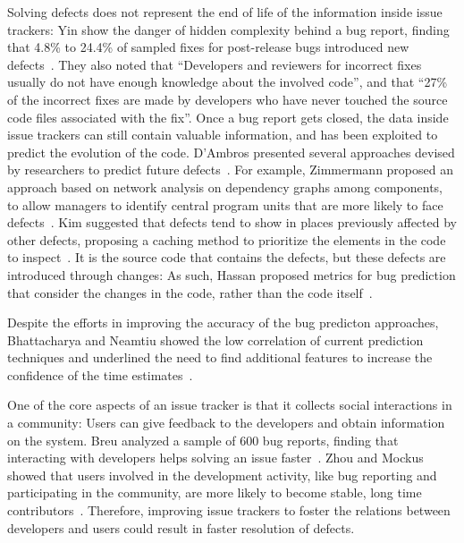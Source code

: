 Solving defects does not represent the end of life of the information inside issue trackers: Yin \etal show the danger of hidden complexity behind a bug report, finding that 4.8\% to 24.4\% of sampled fixes for post-release bugs introduced new defects~\cite{Yin2011a}. They also noted that ``Developers and reviewers for incorrect fixes usually do not have enough knowledge about the involved code'', and that ``27\% of the incorrect fixes are made by developers who have never touched the source code files associated with the fix''. Once a bug report gets closed, the data inside issue trackers can still contain valuable information, and has been exploited to predict the evolution of the code. D'Ambros \etal presented several approaches devised by researchers to predict future defects~\cite{DAmb2012a}. For example,  Zimmermann \etal proposed an approach based on network analysis on dependency graphs among components, to allow managers to identify central program units that are more likely to face defects~\cite{Zimm2008a}. Kim \etal suggested that defects tend to show in places previously affected by other defects, proposing a caching method to prioritize the elements in the code to inspect~\cite{Kim2007a}. It is the source code that contains the defects, but these defects are introduced through changes: As such, Hassan \etal proposed metrics for bug prediction that consider the changes in the code, rather than the code itself~\cite{Hass2009a}.


Despite the efforts in improving the accuracy of the bug predicton approaches, Bhattacharya and Neamtiu showed the low correlation of current prediction techniques and underlined the need to find additional features to increase the confidence of the time estimates~\cite{Bhat2011}.



One of the core aspects of an issue tracker is that it collects social interactions in a community: Users can give feedback to the developers and obtain information on the system. Breu \etal analyzed a sample of 600 bug reports, finding that interacting with developers helps solving an issue faster~\cite{Breu2010}. Zhou and Mockus showed that users involved in the development activity, like bug reporting and participating in the community, are more likely to become stable, long time contributors~\cite{Zhou2015}. Therefore, improving issue trackers to foster the relations between developers and users could result in faster resolution of defects.


